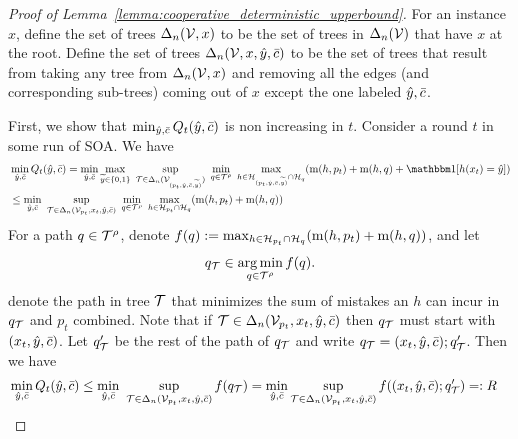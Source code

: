 \documentclass[11pt,letterpaper]{article}
\theoremstyle{definition}
\theoremstyle{plain}
\DeclareMathOperator*{\argmin}{arg\,min}
\begin{document}
\begin{proof}[Proof of Lemma~\ref{lemma:cooperative_deterministic_upperbound}]
For an instance $x$, define the set of trees $\Delta_n({\mathcal V},x)$ to be the set of trees in $\Delta_n({\mathcal V})$ that have $x$ at the root.
Define the set of trees $\Delta_n({\mathcal V},x,{\hat{y}},\bar{c})$ to be the set of trees that result from taking any tree from $\Delta_n({\mathcal V},x)$ and removing all the edges (and corresponding sub-trees) coming out of $x$ except the one labeled ${\hat{y}},\bar{c}$. 

First, we show that $\min_{{\hat{y}},\bar{c}}Q_t({\hat{y}},\bar{c})$ is non increasing in $t$. Consider a round $t$ in some run of SOA. We have
\begin{align*}
  &\min_{\hy,\sc}Q_t(\hy,\sc) = \min_{\hy,\sc} \max_{\vy\in\{0,1\}} ~\sup_{\T\in\Delta_n(\V_{(p_t,\hy, \sc, \vy)})} ~\min_{q\in\T^\rho} ~\max_{h\in \H_{(p_t,\hy, \sc, \vy)}\cap \H_q} (\mi(h, p_t) + \mi(h,q)+\indct[h(x_t) = \hy])\\
  &\leq
    \min_{\hy,\sc}  ~\sup_{\T\in\Delta_n(\V_{p_t},x_t,\hy,\sc)} ~\min_{q\in\T^\rho} ~\max_{h\in \H_{p_t}\cap \H_q} (\mi(h, p_t) + \mi(h,q))
\end{align*}
For a path $q\in{\mathcal T}^\rho$, denote $f(q) := \max_{h\in {{\mathcal H}}_{p_t}\cap {{\mathcal H}}_q} (\mathrm{m}(h, p_t) + \mathrm{m}(h,q))$, and let
\[
q_\T \in \argmin_{q\in\T^\rho} f(q).
\]
denote the path in tree ${\mathcal T}$ that minimizes the sum of mistakes an $h$ can incur in $q_{\mathcal T}$ and $p_t$ combined.
Note that if ${\mathcal T} \in \Delta_n({\mathcal V}_{p_t},x_t,{\hat{y}},\bar{c})$ then $q_{\mathcal T}$ must start with $(x_t,{\hat{y}},\bar{c})$. Let $q'_{\mathcal T}$ be the rest of the path of $q_{\mathcal T}$ and write $q_{\mathcal T} = (x_t,{\hat{y}},\bar{c});q'_{\mathcal T}$. 
Then we have 
\begin{align*}
&\min_{{\hat{y}},\bar{c}}Q_t({\hat{y}},\bar{c})  \leq \min_{{\hat{y}},\bar{c}}  ~\sup_{{\mathcal T}\in\Delta_n({\mathcal V}_{p_t},x_t,{\hat{y}},\bar{c})} f(q_{\mathcal T}) = 
\min_{{\hat{y}},\bar{c}}\sup_{{\mathcal T}\in\Delta_n({\mathcal V}_{p_t},x_t,{\hat{y}},\bar{c})} f((x_t,{\hat{y}},\bar{c});q'_{\mathcal T}) =: R
\end{align*}


\end{proof}
\end{document}
